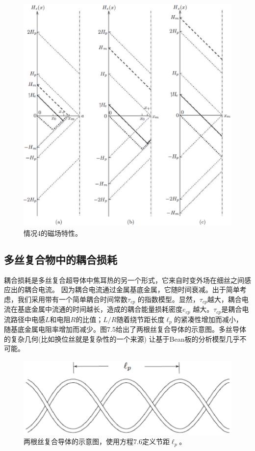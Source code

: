 \begin{figure}[htbp]
	\centering
	\includegraphics[scale=0.6]{chpt7/figs/fig7.4.eps}
	\caption{情况4的磁场特性。}
\end{figure}

\subsection{多丝复合物中的耦合损耗}
耦合损耗是多丝复合超导体中焦耳热的另一个形式，它来自时变外场在细丝之间感应出的耦合电流。
因为耦合电流通过金属基底金属，它随时间衰减。出于简单考虑，我们采用带有一个简单耦合时间常数$\tau_{cp}$
的指数模型。显然，$\tau_{cp}$越大，耦合电流在基底金属中流通的时间越长，造成的耦合能量损耗密度$e_{cp}$
越大。$\tau_{cp}$是耦合电流路径中电感$L$和电阻$R$的比值；$L/R$随着绕节距长度$\ell_p$的紧凑性增加而减小，
随基底金属电阻率增加而减少。图7.5给出了两根丝复合导体的示意图。多丝导体的复杂几何(比如换位丝就是复杂性的一个来源)
让基于Bean板的分析模型几乎不可能。
\begin{figure}[htbp]
	\centering
	\includegraphics[scale=0.6]{chpt7/figs/fig7.5.eps}
	\caption{两根丝复合导体的示意图，使用方程7.6定义节距$\ell_p$。}
\end{figure}

